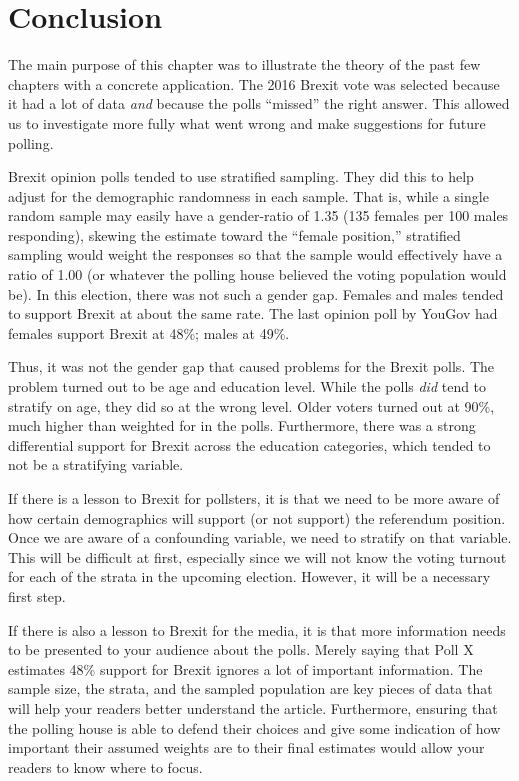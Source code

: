\section{Conclusion}
The main purpose of this chapter was to illustrate the theory of the past few chapters with a concrete application. The 2016 Brexit vote was selected because it had a lot of data \emph{and} because the polls ``missed'' the right answer. This allowed us to investigate more fully what went wrong and make suggestions for future polling.

Brexit opinion polls tended to use stratified sampling. They did this to help adjust for the demographic randomness in each sample. That is, while a single random sample may easily have a gender-ratio of 1.35 (135 females per 100 males responding), skewing the estimate toward the ``female position,'' stratified sampling would weight the responses so that the sample would effectively have a ratio of 1.00 (or whatever the polling house believed the voting population would be). In this election, there was not such a gender gap. Females and males tended to support Brexit at about the same rate. The last opinion poll by YouGov had females support Brexit at 48\%; males at 49\%.\cite{yougov-2016} 

Thus, it was not the gender gap that caused problems for the Brexit polls. The problem turned out to be age and education level. While the polls \emph{did} tend to stratify on age, they did so at the wrong level. Older voters turned out at 90\%, much higher than weighted for in the polls. Furthermore, there was a strong differential support for Brexit across the education categories, which tended to not be a stratifying variable.




If there is a lesson to Brexit for pollsters, it is that we need to be more aware of how certain demographics will support (or not support) the referendum position. Once we are aware of a confounding variable, we need to stratify on that variable. This will be difficult at first, especially since we will not know the voting turnout for each of the strata in the upcoming election. However, it will be a necessary first step.


If there is also a lesson to Brexit for the media, it is that more information needs to be presented to your audience about the polls. Merely saying that Poll X estimates 48\% support for Brexit ignores a lot of important information. The sample size, the strata, and the sampled population are key pieces of data that will help your readers better understand the article. Furthermore, ensuring that the polling house is able to defend their choices and give some indication of how important their assumed weights are to their final estimates would allow your readers to know where to focus.












